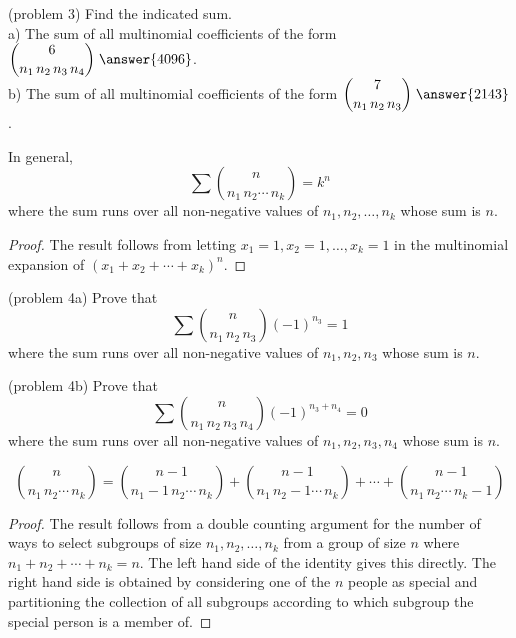 \documentclass[handout]{ximera}
\begin{document}
\begin{problem}(problem 3)
Find the indicated sum.\\
a) The sum of all multinomial coefficients of the form $\dis \binom{6}{n_1\, n_2\, n_3\, n_4}\; \answer{4096}$.\\[8pt]
b) The sum of all multinomial coefficients of the form $\dis \binom{7}{n_1\, n_2\, n_3} \; \answer{2143}$.\\

\end{problem}
 
\begin{proposition}
In general,
\[
\sum \binom{n}{n_1 \, n_2 \cdots \, n_k} = k^n
\]
where the sum runs over all non-negative values of $n_1, n_2, \dots, n_k$ whose sum is $n$.
\end{proposition}

\begin{proof}
The result follows from letting $x_1 = 1, x_2 = 1, \dots, x_k = 1$ in the multinomial expansion of 
$(x_1 + x_2 + \cdots + x_k)^n$.
\end{proof}

\begin{problem}(problem 4a)
Prove that
\[
\sum \binom{n}{n_1 \, n_2 \, n_3} (-1)^{n_3} = 1
\]
where the sum runs over all non-negative values of $n_1, n_2, n_3$ whose sum is $n$.
\end{problem}

\begin{problem}(problem 4b)
Prove that
\[
\sum \binom{n}{n_1 \, n_2 \, n_3 \, n_4} (-1)^{n_3 + n_4} = 0
\]
where the sum runs over all non-negative values of $n_1, n_2, n_3, n_4$ whose sum is $n$.
\end{problem}



\begin{proposition}
\[
\binom{n}{n_1 \, n_2 \cdots \, n_k} = \binom{n-1}{n_1 -1 \, n_2 \cdots \, n_k} + \binom{n-1}{n_1 \, n_2 -1 \cdots \, n_k} + \cdots+ \binom{n-1}{n_1 \, n_2 \cdots \, n_k -1 }
\]
\end{proposition}

\begin{proof}
The result follows from a double counting argument for the number of ways to select 
subgroups of size $n_1, n_2, \dots, n_k$ from a group of size $n$ where $n_1 + n_2 + \cdots + n_k = n$. 
The left hand side of the identity gives this directly.  The right hand side is obtained by 
considering one of the $n$ people as special and partitioning the collection of all subgroups 
according to which subgroup the special person is a member of.
\end{proof}



\end{document}
